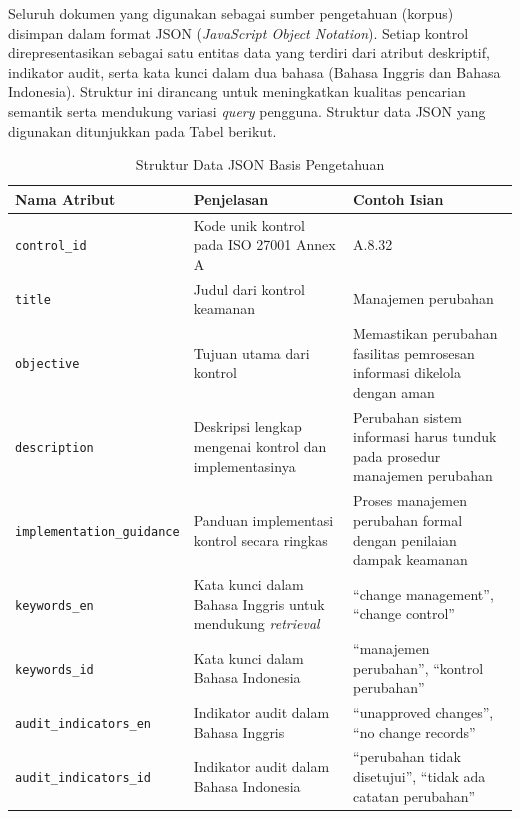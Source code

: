 Seluruh dokumen yang digunakan sebagai sumber pengetahuan (korpus) disimpan dalam format JSON (\textit{JavaScript Object Notation}). Setiap kontrol direpresentasikan sebagai satu entitas data yang terdiri dari atribut deskriptif, indikator audit, serta kata kunci dalam dua bahasa (Bahasa Inggris dan Bahasa Indonesia). Struktur ini dirancang untuk meningkatkan kualitas pencarian semantik serta mendukung variasi \textit{query} pengguna. Struktur data JSON yang digunakan ditunjukkan pada Tabel berikut.




\begin{table}[H]
\centering
\footnotesize
\caption{Struktur Data JSON Basis Pengetahuan}
\label{tab:json_struktur_deskriptif}
\begin{tabular}{|>{\raggedright\arraybackslash}p{3.2cm}|>{\raggedright\arraybackslash}p{4.8cm}|>{\raggedright\arraybackslash}p{4.8cm}|}
\hline
\textbf{Nama Atribut} & \textbf{Penjelasan} & \textbf{Contoh Isian} \\
\hline
\texttt{control\_id} & Kode unik kontrol pada ISO 27001 Annex A & A.8.32 \\
\hline
\texttt{title} & Judul dari kontrol keamanan & Manajemen perubahan \\
\hline
\texttt{objective} & Tujuan utama dari kontrol & Memastikan perubahan fasilitas pemrosesan informasi dikelola dengan aman \\
\hline
\texttt{description} & Deskripsi lengkap mengenai kontrol dan implementasinya & Perubahan sistem informasi harus tunduk pada prosedur manajemen perubahan \\
\hline
\texttt{implementation}\newline\texttt{\_guidance} & Panduan implementasi kontrol secara ringkas & Proses manajemen perubahan formal dengan penilaian dampak keamanan \\
\hline
\texttt{keywords\_en} & Kata kunci dalam Bahasa Inggris untuk mendukung \textit{retrieval} & ``change management'', ``change control'' \\
\hline
\texttt{keywords\_id} & Kata kunci dalam Bahasa Indonesia & ``manajemen perubahan'', ``kontrol perubahan'' \\
\hline
\texttt{audit}\newline\texttt{\_indicators\_en} & Indikator audit dalam Bahasa Inggris & ``unapproved changes'', ``no change records'' \\
\hline
\texttt{audit}\newline\texttt{\_indicators\_id} & Indikator audit dalam Bahasa Indonesia & ``perubahan tidak disetujui'', ``tidak ada catatan perubahan'' \\

\end{tabular}
\end{table}
